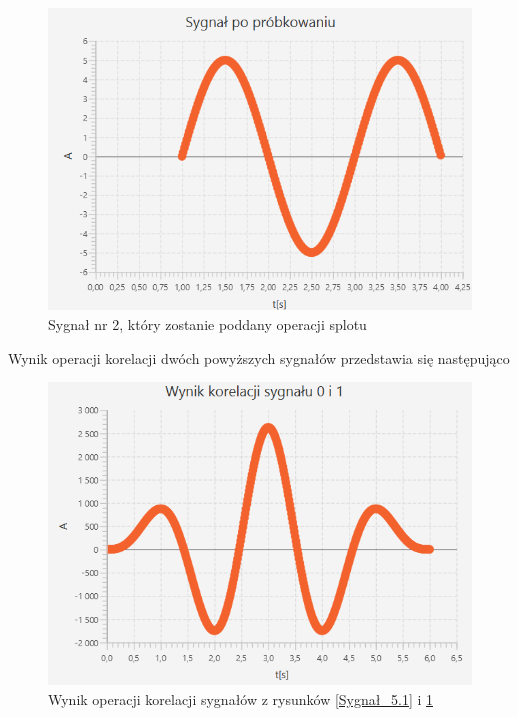 \documentclass[12pt]{article}
\begin{document}
\begin{figure}[H]
    \centering
	\includegraphics[width=\linewidth]{sygnal_po_probkowaniu_1.2.png}
    \caption{Sygnał nr 2, który zostanie poddany operacji splotu}
    \label{Sygnał_5.2}
\end{figure}

Wynik operacji korelacji dwóch powyższych sygnałów przedstawia się następująco
\begin{figure}[H]
    \centering
	\includegraphics[width=\linewidth]{Korelacja_5.1.png}
    \caption{Wynik operacji korelacji sygnałów z rysunków \ref{Sygnał_5.1} i \ref{Sygnał_5.2}}
    \label{Wynik_5.1}
\end{figure}
\end{document}
